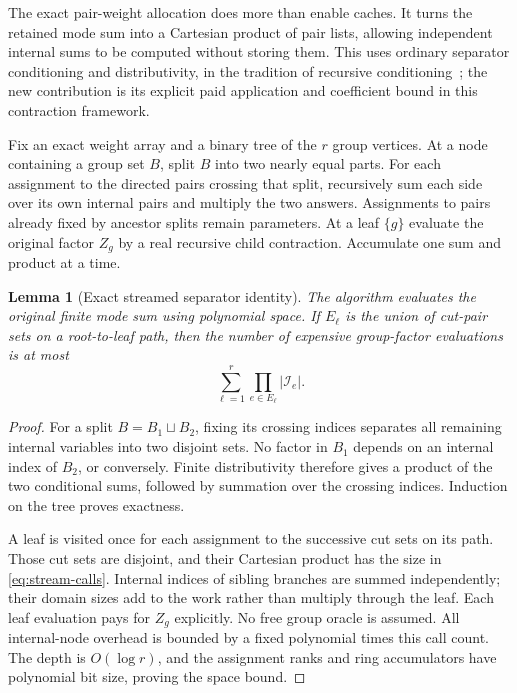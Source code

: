 \documentclass[11pt]{article}
\newtheorem{lemma}[theorem]{Lemma}
\theoremstyle{definition}\newtheorem{definition}[theorem]{Definition}
\theoremstyle{remark}\newtheorem{remark}[theorem]{Remark}
\begin{document}
The exact pair-weight allocation does more than enable caches. It turns the
retained mode sum into a Cartesian product of pair lists, allowing independent
internal sums to be computed without storing them. This uses ordinary
separator conditioning and distributivity, in the tradition of recursive
conditioning~\cite{darwiche}; the new contribution is its
explicit paid application and coefficient bound in this contraction framework.

Fix an exact weight array and a binary tree of the $r$ group vertices.
At a node containing a group set $B$, split $B$ into two nearly equal parts.
For each assignment to the directed pairs crossing that split, recursively
sum each side over its own internal pairs and multiply the two answers.
Assignments to pairs already fixed by ancestor splits remain parameters.
At a leaf $\{g\}$ evaluate the original factor $Z_g$ by a real recursive
child contraction. Accumulate one sum and product at a time.

\begin{lemma}[Exact streamed separator identity]\label{lem:stream-exact}
The algorithm evaluates the original finite mode sum using polynomial space.
If $E_\ell$ is the union of cut-pair sets on a root-to-leaf path, then the
number of expensive group-factor evaluations is at most
\begin{equation}
 \sum_{\ell=1}^r\prod_{e\in E_\ell}|\mathcal I_e|.
 \label{eq:stream-calls}
\end{equation}
\end{lemma}
\begin{proof}
For a split $B=B_1\sqcup B_2$, fixing its crossing indices separates all
remaining internal variables into two disjoint sets. No factor in $B_1$
depends on an internal index of $B_2$, or conversely. Finite distributivity
therefore gives a product of the two conditional sums, followed by summation
over the crossing indices. Induction on the tree proves exactness.

A leaf is visited once for each assignment to the successive cut sets on its
path. Those cut sets are disjoint, and their Cartesian product has the size
in \eqref{eq:stream-calls}. Internal indices of sibling branches are summed
independently; their domain sizes add to the work rather than multiply
through the leaf. Each leaf evaluation pays for $Z_g$ explicitly. No free
group oracle is assumed. All internal-node overhead is bounded by a fixed
polynomial times this call count. The depth is $O(\log r)$, and the assignment
ranks and ring accumulators have polynomial bit size, proving the space bound.
\end{proof}
\end{document}
